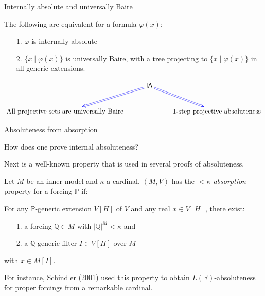 \documentclass[handout, dvipsnames, usenames, 9pt, serif]{beamer}
\newcommand{\PP}{\mathbb{P}}
\newcommand{\QQ}{\mathbb{Q}}
\newcommand{\RR}{\mathbb{R}}
\newcommand{\IA}{\mathsf{IA}}
\newcommand{\BS}{{}^\omega\omega}
\newcommand{\cb}{\color{blue}}
\begin{document}
\begin{frame}{Internally absolute and universally Baire} 

\medskip 
\begin{block}{} 
The following are equivalent for a formula $\varphi(x)$: 
\begin{enumerate} 
\item[1.] 
$\varphi$ is internally absolute 
\item[2.] 
$\{x\mid \varphi(x)\}$ is universally Baire, with a tree projecting to $\{x\mid \varphi(x)\}$ in all generic extensions. 
\end{enumerate} 
\end{block}{} 

\xymatrixrowsep{0.4cm}
\xymatrixcolsep{0.1cm}
\[ \xymatrix{ & \IA \ar@{=>}@[blue][dr] & \\  
\text{All projective sets are universally Baire } \ar@{<=}@[blue][ur] &   & \text{$1$-step projective absoluteness}  
} 
\] 

%

\end{frame}



\begin{frame}{Absoluteness from absorption} 


How does one prove internal absoluteness? 
\pause  

\medskip 
Next is a well-known property that is used in several proofs of absoluteness. 

\begin{definition} 
Let $M$ be an inner model and $\kappa$ a cardinal. $(M,V)$ has the {\cb \emph{${<}\kappa$-absorption}} property for a forcing $\PP$ if: 

\medskip 
For any $\PP$-generic extension $V[H]$ of $V$ and any real $x\in V[H]$, there exist: 
\begin{enumerate} 
\item[1.] 
a forcing $\QQ\in M$ with $|\QQ|^M<\kappa$ and 
\item[2.] 
a $\QQ$-generic filter $I\in V[H]$ over $M$ 
\end{enumerate} 
with $x\in M[I]$. 
\end{definition} 
\pause  

\medskip 
For instance, Schindler (2001) used this property to obtain $L(\RR)$-absoluteness for proper forcings from a remarkable cardinal. 

\end{frame}
\end{document}
